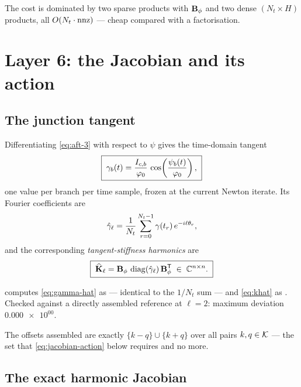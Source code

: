 The cost is dominated by two sparse products with $\mathbf{B}_{\phi}$ and two dense
$(N_t\times H)$ products, all $O(N_t \cdot \operatorname{nnz})$ --- cheap compared with a
factorisation.

\section{Layer 6: the Jacobian and its action}
\label{sec:jacobian}

\subsection{The junction tangent}

Differentiating \eqref{eq:aft-3} with respect to $\psi$ gives the time-domain
tangent
\begin{equation}
  \boxed{\;
  \gamma_b(t) = \frac{I_{c,b}}{\varphi_{0}}\,
                \cos\!\left(\frac{\psi_b(t)}{\varphi_{0}}\right),
  \;}
  \label{eq:gamma-t}
\end{equation}
one value per branch per time sample, frozen at the current Newton iterate. Its
Fourier coefficients are
\begin{equation}
  \hat{\gamma}_\ell = \frac{1}{N_t}\sum_{r=0}^{N_t-1}\gamma(t_r)\,e^{-i\ell\theta_r},
  \label{eq:gamma-hat}
\end{equation}
and the corresponding \emph{tangent-stiffness harmonics} are
\begin{equation}
  \boxed{\;
  \widehat{\mathbf{K}}_\ell = \mathbf{B}_{\phi}\,\operatorname{diag}(\hat{\gamma}_\ell)\,\mathbf{B}_{\phi}^{\mathsf T}
  \;\in\;\mathbb{C}^{n\times n}.
  \;}
  \label{eq:khat}
\end{equation}

\begin{implnote}[verified]
 computes \eqref{eq:gamma-hat} as
 --- identical to the
$1/N_t$ sum --- and \eqref{eq:khat} as
. Checked against a directly
assembled reference at $\ell=2$: maximum deviation $\num{0.000e+00}$.

The offsets assembled are exactly
$\{k-q\}\cup\{k+q\}$ over all pairs $k,q\in\mathcal{K}$ --- the set that
\eqref{eq:jacobian-action} below requires and no more.
\end{implnote}

\subsection{The exact harmonic Jacobian}

